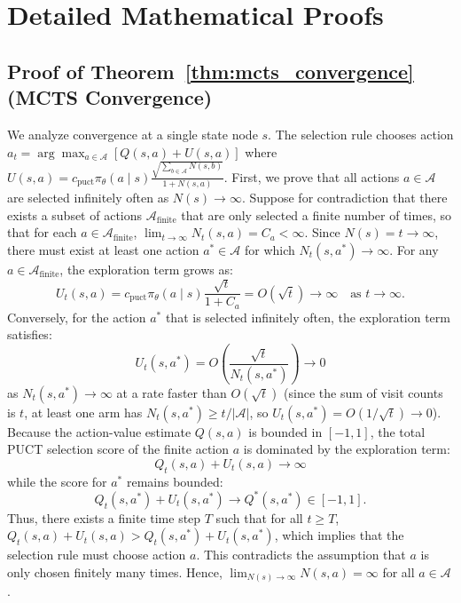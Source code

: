 \documentclass{article}
\begin{document}
\appendix
\section{Detailed Mathematical Proofs}

\subsection{Proof of Theorem~\ref{thm:mcts_convergence} (MCTS Convergence)}\label{app:proof_mcts_convergence}
We analyze convergence at a single state node $s$. The selection rule chooses action $a_t = \arg\max_{a \in \mathcal{A}} [Q(s, a) + U(s, a)]$ where $U(s, a) = c_{\mathrm{puct}} \pi_\theta(a \mid s) \frac{\sqrt{\sum_{b \in \mathcal{A}} N(s, b)}}{1 + N(s, a)}$.
First, we prove that all actions $a \in \mathcal{A}$ are selected infinitely often as $N(s) \to \infty$. Suppose for contradiction that there exists a subset of actions $\mathcal{A}_{\text{finite}}$ that are only selected a finite number of times, so that for each $a \in \mathcal{A}_{\text{finite}}$, $\lim_{t \to \infty} N_t(s, a) = C_a < \infty$. Since $N(s) = t \to \infty$, there must exist at least one action $a^* \in \mathcal{A}$ for which $N_t(s, a^*) \to \infty$.
For any $a \in \mathcal{A}_{\text{finite}}$, the exploration term grows as:
\begin{equation}
    U_t(s, a) = c_{\mathrm{puct}} \pi_\theta(a \mid s) \frac{\sqrt{t}}{1 + C_a} = O(\sqrt{t}) \to \infty \quad \text{as } t \to \infty.
\end{equation}
Conversely, for the action $a^*$ that is selected infinitely often, the exploration term satisfies:
\begin{equation}
    U_t(s, a^*) = O\left(\frac{\sqrt{t}}{N_t(s, a^*)}\right) \to 0
\end{equation}
as $N_t(s, a^*) \to \infty$ at a rate faster than $O(\sqrt{t})$ (since the sum of visit counts is $t$, at least one arm has $N_t(s, a^*) \geq t / |\mathcal{A}|$, so $U_t(s, a^*) = O(1/\sqrt{t}) \to 0$).
Because the action-value estimate $Q(s, a)$ is bounded in $[-1, 1]$, the total PUCT selection score of the finite action $a$ is dominated by the exploration term:
\begin{equation}
    Q_t(s, a) + U_t(s, a) \to \infty
\end{equation}
while the score for $a^*$ remains bounded:
\begin{equation}
    Q_t(s, a^*) + U_t(s, a^*) \to Q^*(s, a^*) \in [-1, 1].
\end{equation}
Thus, there exists a finite time step $T$ such that for all $t \geq T$, $Q_t(s, a) + U_t(s, a) > Q_t(s, a^*) + U_t(s, a^*)$, which implies that the selection rule must choose action $a$. This contradicts the assumption that $a$ is only chosen finitely many times. Hence, $\lim_{N(s) \to \infty} N(s, a) = \infty$ for all $a \in \mathcal{A}$.
\end{document}
